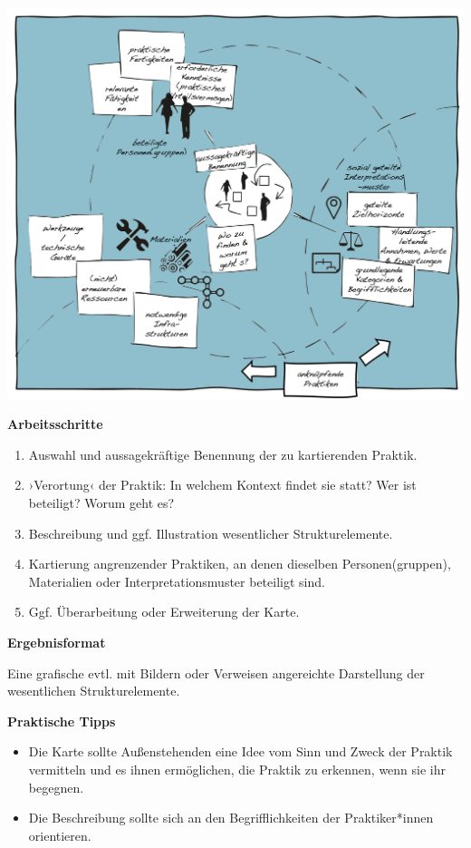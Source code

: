 \documentclass[
  a4paper,
]{book}
\providecommand{\tightlist}{%
  \setlength{\itemsep}{0pt}\setlength{\parskip}{0pt}}
\begin{document}
\begin{center}\includegraphics{Figures/05-03-Kartierung} \end{center}

\textbf{Arbeitsschritte}

\begin{enumerate}
\def\labelenumi{\arabic{enumi}.}
\tightlist
\item
  Auswahl und aussagekräftige Benennung der zu kartierenden Praktik.
\item
  ›Verortung‹ der Praktik: In welchem Kontext findet sie statt? Wer ist beteiligt? Worum geht es?
\item
  Beschreibung und ggf. Illustration wesentlicher Strukturelemente.
\item
  Kartierung angrenzender Praktiken, an denen dieselben Personen(gruppen), Materialien oder Interpretationsmuster beteiligt sind.
\item
  Ggf. Überarbeitung oder Erweiterung der Karte.
\end{enumerate}

\textbf{Ergebnisformat}

Eine grafische evtl. mit Bildern oder Verweisen angereichte Darstellung der wesentlichen Strukturelemente.

\textbf{Praktische Tipps}

\begin{itemize}
\tightlist
\item
  Die Karte sollte Außenstehenden eine Idee vom Sinn und Zweck der Praktik vermitteln und es ihnen ermöglichen, die Praktik zu erkennen, wenn sie ihr begegnen.
\item
  Die Beschreibung sollte sich an den Begrifflichkeiten der Praktiker*innen orientieren.
\end{itemize}
\end{document}
